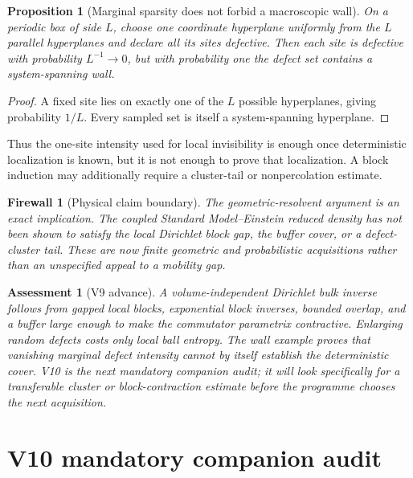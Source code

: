 \documentclass[11pt]{article}
\newtheorem{proposition}[theorem]{Proposition}
\newtheorem{assessment}[theorem]{Assessment}
\newtheorem{firewall}[theorem]{Firewall}
\begin{document}
\begin{proposition}[Marginal sparsity does not forbid a macroscopic wall]
\label{prop:v11v9-wall}
On a periodic box of side \(L\), choose one coordinate hyperplane
uniformly from the \(L\) parallel hyperplanes and declare all its sites
defective.  Then each site is defective with probability \(L^{-1}\to0\),
but with probability one the defect set contains a system-spanning wall.
\end{proposition}

\begin{proof}
A fixed site lies on exactly one of the \(L\) possible hyperplanes, giving
probability \(1/L\).  Every sampled set is itself a system-spanning
hyperplane.
\end{proof}

Thus the one-site intensity used for local invisibility is enough once
deterministic localization is known, but it is not enough to prove that
localization.  A block induction may additionally require a cluster-tail
or nonpercolation estimate.

\begin{firewall}[Physical claim boundary]
\label{fw:v11v9-physical}
The geometric-resolvent argument is an exact implication.  The coupled
Standard Model--Einstein reduced density has not been shown to satisfy the
local Dirichlet block gap, the buffer cover, or a defect-cluster tail.
These are now finite geometric and probabilistic acquisitions rather than
an unspecified appeal to a mobility gap.
\end{firewall}

\begin{assessment}[V9 advance]
\label{ass:v11v9}
A volume-independent Dirichlet bulk inverse follows from gapped local
blocks, exponential block inverses, bounded overlap, and a buffer large
enough to make the commutator parametrix contractive.  Enlarging random
defects costs only local ball entropy.  The wall example proves that
vanishing marginal defect intensity cannot by itself establish the
deterministic cover.  V10 is the next mandatory companion audit; it will
look specifically for a transferable cluster or block-contraction
estimate before the programme chooses the next acquisition.
\end{assessment}


\section{V10 mandatory companion audit}
\label{sec:v11v10}
\end{document}
